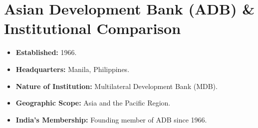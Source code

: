 \section{Asian Development Bank (ADB) \& Institutional Comparison}

\begin{formulabox}
\begin{itemize}[leftmargin=*, noitemsep]
    \item \textbf{Established:} 1966.
    \item \textbf{Headquarters:} Manila, Philippines.
    \item \textbf{Nature of Institution:} Multilateral Development Bank (MDB).
    \item \textbf{Geographic Scope:} Asia and the Pacific Region.
    \item \textbf{India's Membership:} Founding member of ADB since 1966.
\end{itemize}
\end{formulabox}

